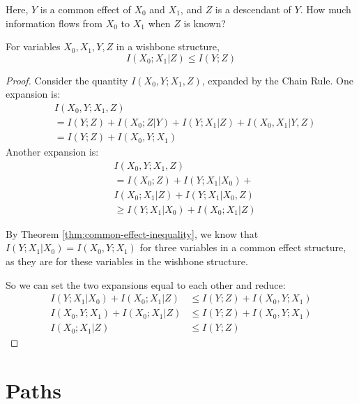 \documentclass[../thesis.tex]{subfiles}
\begin{document}
Here, $Y$ is a common effect of $X_0$ and $X_1$,
and $Z$ is a descendant of $Y$.
How much information flows from $X_0$ to $X_1$
when $Z$ is known?

\begin{thm}
  \label{thm:wishbone}
  For variables $X_0, X_1, Y, Z$ in a wishbone structure,
  $$I(X_0;X_1 \vert Z) \leq I(Y;Z)$$
\end{thm}
\begin{proof}
  Consider the quantity $I(X_0, Y; X_1, Z)$,
  expanded by the Chain Rule.
  One expansion is:
  \begin{equation}
    \begin{split}
      & I(X_0, Y; X_1, Z) \\
      & = I(Y;Z) + I(X_0;Z \vert Y) + I(Y; X_1 \vert Z) + I(X_0, X_1 \vert Y,Z) \\
      & = I(Y;Z) + I(X_0,Y;X_1)
    \end{split}
  \end{equation}
  Another expansion is:
  \begin{equation}
    \begin{split}
      & I(X_0, Y; X_1, Z) \\
      & = I(X_0;Z) + I(Y;X_1 \vert X_0) + \\
      & I(X_0; X_1 \vert Z) + I(Y; X_1 \vert X_0,Z) \\
      & \geq I(Y; X_1 \vert X_0) + I(X_0; X_1 \vert Z) 
    \end{split}
  \end{equation}

  By Theorem \ref{thm:common-effect-inequality},
  we know that $I(Y;X_1 \vert X_0) = I(X_0,Y;X_1)$
  for three variables in a common effect structure,
  as they are for these variables in the wishbone structure.

  So we can set the two expansions equal to each other and reduce:
  \begin{equation}
    \begin{split}
      I(Y; X_1 \vert X_0) + I(X_0; X_1 \vert Z) & \leq I(Y;Z) + I(X_0,Y;X_1) \\
      I(X_0, Y; X_1) + I(X_0; X_1 \vert Z) & \leq I(Y;Z) + I(X_0,Y;X_1) \\
      I(X_0; X_1 \vert Z) & \leq I(Y;Z)
    \end{split}
  \end{equation}
\end{proof}

\section{Paths}
\end{document}
